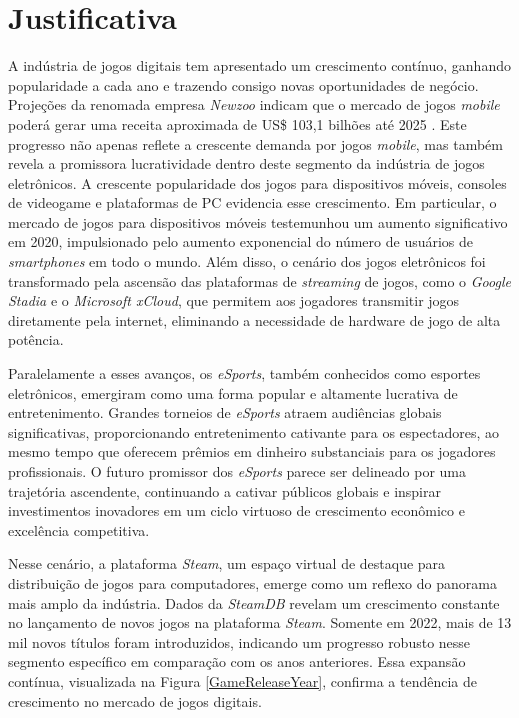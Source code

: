 \section{Justificativa} 
\label{justificativa}

A indústria de jogos digitais tem apresentado um crescimento contínuo, ganhando popularidade a cada ano e trazendo consigo novas oportunidades de negócio. Projeções da renomada empresa \textit{\gls{Newzoo}} indicam que o mercado de jogos \textit{mobile} poderá gerar uma receita aproximada de US\$ 103,1 bilhões até 2025 \cite{game_market_2022}. Este progresso não apenas reflete a crescente demanda por jogos \textit{mobile}, mas também revela a promissora lucratividade dentro deste segmento da indústria de jogos eletrônicos. A crescente popularidade dos jogos para dispositivos móveis, consoles de videogame e plataformas de PC evidencia esse crescimento. Em particular, o mercado de jogos para dispositivos móveis testemunhou um aumento significativo em 2020, impulsionado pelo aumento exponencial do número de usuários de \textit{smartphones} em todo o mundo. Além disso, o cenário dos jogos eletrônicos foi transformado pela ascensão das plataformas de \textit{streaming} de jogos, como o \textit{Google Stadia} e o \textit{Microsoft xCloud}, que permitem aos jogadores transmitir jogos diretamente pela internet, eliminando a necessidade de hardware de jogo de alta potência.

Paralelamente a esses avanços, os \textit{eSports}, também conhecidos como esportes eletrônicos, emergiram como uma forma popular e altamente lucrativa de entretenimento. Grandes torneios de \textit{eSports} atraem audiências globais significativas, proporcionando entretenimento cativante para os espectadores, ao mesmo tempo que oferecem prêmios em dinheiro substanciais para os jogadores profissionais. O futuro promissor dos \textit{eSports} parece ser delineado por uma trajetória ascendente, continuando a cativar públicos globais e inspirar investimentos inovadores em um ciclo virtuoso de crescimento econômico e excelência competitiva.

Nesse cenário, a plataforma \textit{\gls{Steam}}, um espaço virtual de destaque para distribuição de jogos para computadores, emerge como um reflexo do panorama mais amplo da indústria. Dados da \textit{\gls{SteamDB}} revelam um crescimento constante no lançamento de novos jogos na plataforma \textit{\gls{Steam}}. Somente em 2022, mais de 13 mil novos títulos foram introduzidos, indicando um progresso robusto nesse segmento específico em comparação com os anos anteriores. Essa expansão contínua, visualizada na Figura \ref{GameReleaseYear}, confirma a tendência de crescimento no mercado de jogos digitais.

